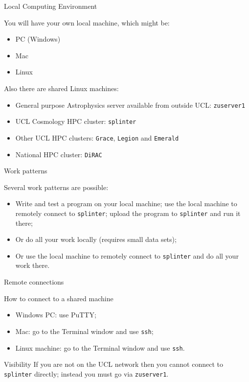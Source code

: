 \documentclass{beamer}
\begin{document}
\begin{frame}{Local Computing Environment}
  \begin{block}{You will have your own local machine, which might be:}
    \begin{itemize}
      \item PC (Windows)
      \item Mac
      \item Linux
    \end{itemize}
  \end{block}
  \begin{block}{Also there are shared Linux machines:}
    \begin{itemize}
      \item General purpose Astrophysics server available from outside UCL: \alert{\texttt{zuserver1}}
      \item UCL Cosmology HPC cluster: \alert{\texttt{splinter}}
      \item Other UCL HPC clusters: \alert{\texttt{Grace}}, \alert{\texttt{Legion}} and \alert{\texttt{Emerald}}
      \item National HPC cluster: \alert{\texttt{DiRAC}}
    \end{itemize}
  \end{block}
\end{frame}

\begin{frame}{Work patterns}
  \begin{block}{Several work patterns are possible:}
    \begin{itemize}
      \item Write and test a program on your local machine; use the local machine to remotely connect to \texttt{splinter}; upload the program to \texttt{splinter} and run it there;
      \item Or do all your work locally (requires small data sets);
      \item Or use the local machine to remotely connect to \texttt{splinter} and do all your work there.
    \end{itemize}
  \end{block}
\end{frame}

\begin{frame}{Remote connections}
  \begin{block}{How to connect to a shared machine}
    \begin{itemize}
      \item Windows PC: use PuTTY;
      \item Mac: go to the Terminal window and use \texttt{ssh};
      \item Linux machine: go to the Terminal window and use \texttt{ssh}.
    \end{itemize}
  \end{block}
  \begin{block}{Visibility}
    If you are not on the UCL network then you cannot connect to \texttt{splinter} directly; instead you must go via \texttt{zuserver1}.
  \end{block}
\end{frame}
\end{document}
